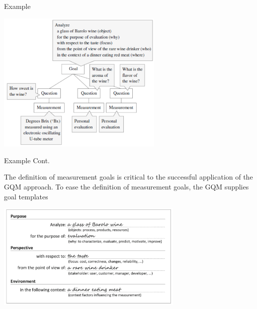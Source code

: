 \documentclass{beamer}
\begin{document}
\begin{frame}{\centerline{Example}}


\begin{center}
\includegraphics[width=80mm]{A2022.IDSEPC.SperimentazioneDeduzione/image-03.png}
\end{center}

\end{frame}

\begin{frame}{\centerline{Example Cont.}}


The definition of measurement goals is critical to the successful application of the GQM approach. To ease the definition of measurement goals, the GQM supplies goal templates
\begin{center}
\includegraphics[width=90mm]{A2022.IDSEPC.SperimentazioneDeduzione/image-04.png}
\end{center}
\end{frame}
\end{document}
